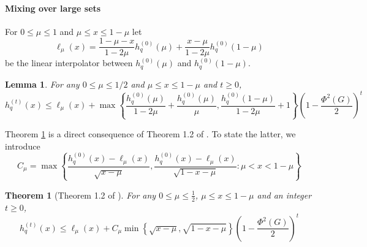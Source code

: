 \documentclass[11pt,twoside]{article}
\newtheorem{theorem}{Theorem}
\newtheorem{lemma}{Lemma}
\newcommand{\set}[1]{\left\{#1\right\}}
\newcommand{\1}{\mathbf{1}}
\begin{document}
\paragraph{Mixing over large sets}

For $0 \leq \mu \leq 1$ and $\mu \leq x \leq 1 - \mu$ let 
\begin{equation*}
\ell_{\mu}(x) = \frac{1 - \mu - x}{1 - 2\mu} h_q^{(0)}(\mu) + \frac{x - \mu}{1 - 2\mu}h_q^{(0)}(1 - \mu)
\end{equation*}
be the linear interpolator between $h_q^{(0)}(\mu)$ and $h_q^{(0)}(1 - \mu)$. 

\begin{lemma}
	\label{lem: lt_ub}
	For any $0 \leq \mu \leq 1/2$ and $\mu \leq x \leq 1 - \mu$ and $t \geq 0$, 
	\begin{equation*}
	h_q^{(t)}(x) \leq \ell_{\mu}(x) + \max \set{\frac{h_q^{(0)}(\mu)}{1 - 2\mu} + \frac{h_q^{(0)}(\mu)}{\mu} , \frac{h_q^{(0)}(1 - \mu) }{1 - 2\mu} + 1 }\left(1 - \frac{\Phi^2(G)}{2}\right)^t
	\end{equation*}
\end{lemma}

Theorem \ref{lem: lt_ub} is a direct consequence of Theorem 1.2 of \cite{lovasz1990}. To state the latter, we introduce
\begin{equation*}
C_{\mu} = \max \set{\frac{h_q^{(0)}(x) - \ell_{\mu}(x)}{\sqrt{x - \mu}}, \frac{h_q^{(0)}(x) - \ell_{\mu}(x)}{\sqrt{1 - x - \mu}}: \mu < x < 1 - \mu}
\end{equation*}
\begin{theorem}[Theorem 1.2 of \cite{lovasz1990}]
	\label{thm: lovasz_simonovits_1993}
	For any $0 \leq \mu \leq \frac{1}{2}$, $\mu \leq x \leq 1 - \mu$ and an integer $t \geq 0$,
	\begin{equation*}
	h_q^{(t)}(x) \leq \ell_{\mu}(x) + C_{\mu} \min \set{\sqrt{x - \mu}, \sqrt{1 - x - \mu}} \left(1 - \frac{\Phi^2(G)}{2}\right)^t
	\end{equation*}
\end{theorem}
\end{document}
